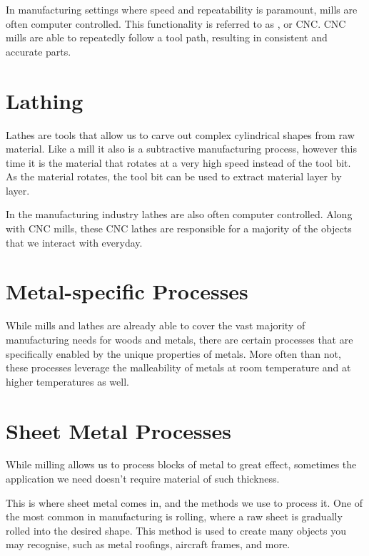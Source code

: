In manufacturing settings where speed and repeatability is paramount, mills are often computer controlled. This functionality is referred to as , or CNC. CNC mills are able to repeatedly follow a tool path, resulting in consistent and accurate parts.

\section{Lathing}

Lathes are tools that allow us to carve out complex cylindrical shapes from raw material. Like a mill it also is a subtractive manufacturing process, however this time it is the material that rotates at a very high speed instead of the tool bit. As the material rotates, the tool bit can be used to extract material layer by layer. 


In the manufacturing industry lathes are also often computer controlled. Along with CNC mills, these CNC lathes are responsible for a majority of the objects that we interact with everyday.

\section{Metal-specific Processes}

While mills and lathes are already able to cover the vast majority of manufacturing needs for woods and metals, there are certain processes that are specifically enabled by the unique properties of metals. More often than not, these processes leverage the malleability of metals at room temperature and at higher temperatures as well.

\section{Sheet Metal Processes}

While milling allows us to process blocks of metal to great effect, sometimes the application we need doesn’t require material of such thickness.

This is where sheet metal comes in, and the methods we use to process it. One of the most common in manufacturing is rolling, where a raw sheet is gradually rolled into the desired shape. This method is used to create many objects you may recognise, such as metal roofings, aircraft frames, and more.

